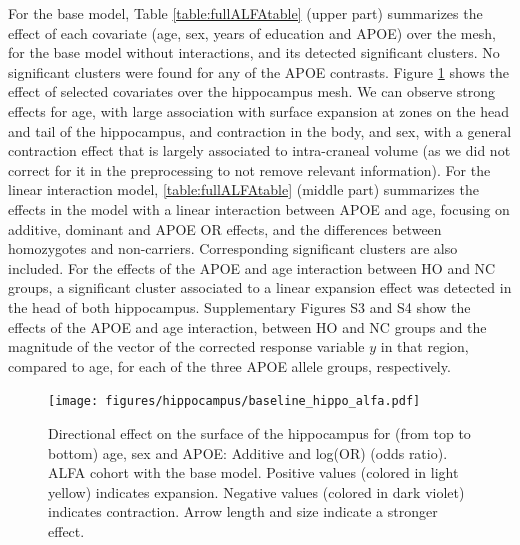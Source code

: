 For the base model, Table \ref{table:fullALFAtable} (upper part) summarizes the effect of each covariate (age, sex, years of education and APOE) over the mesh, for the base model without interactions, and its detected significant clusters. No significant clusters were found for any of the APOE contrasts. Figure \ref{fig:alfabaselinefig1} shows the effect of selected covariates over the hippocampus mesh. We can observe strong effects for age, with large association with surface expansion at zones on the head and tail of the hippocampus, and contraction in the body, and sex, with a general contraction effect that is largely associated to intra-craneal volume (as we did not correct for it in the preprocessing to not remove relevant information). For the linear interaction model, \ref{table:fullALFAtable} (middle part) summarizes the effects in the model with a linear interaction between APOE and age, focusing on additive, dominant and APOE OR effects, and the differences between homozygotes and non-carriers. Corresponding significant clusters are also included. For the effects of the APOE and age interaction between HO and NC groups, a significant cluster associated to a linear expansion effect was detected in the head of both hippocampus. Supplementary Figures S3 and S4 show the effects of the APOE and age interaction, between HO and NC groups and the magnitude of the vector of the corrected response variable $y$ in that region, compared to age, for each of the three APOE allele groups, respectively.  \\

\begin{figure}[htbp]
  \centering
  \texttt{[image: figures/hippocampus/baseline\_hippo\_alfa.pdf]}
  \caption[Directional effect on the surface of the hippocampus, ALFA cohort.]{Directional effect on the surface of the hippocampus for (from top to bottom) age, sex and APOE: Additive and log(OR) (odds ratio). ALFA cohort with the base model. Positive values (colored in light yellow) indicates expansion. Negative values (colored in dark violet) indicates contraction. Arrow length and size indicate a stronger effect.}\label{fig:alfabaselinefig1}
\end{figure}

